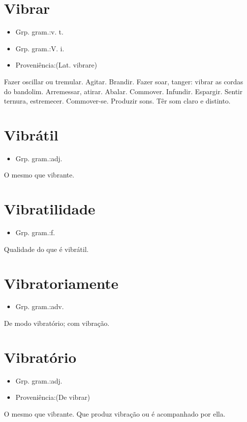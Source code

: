 \documentclass{article}
\begin{document}
\section{Vibrar}
\begin{itemize}
\item {Grp. gram.:v. t.}
\end{itemize}
\begin{itemize}
\item {Grp. gram.:V. i.}
\end{itemize}
\begin{itemize}
\item {Proveniência:(Lat. \textunderscore vibrare\textunderscore )}
\end{itemize}
Fazer oscillar ou tremular.
Agitar.
Brandir.
Fazer soar, tanger: \textunderscore vibrar as cordas do bandolim\textunderscore .
Arremessar, atirar.
Abalar.
Commover.
Infundir.
Espargir.
Sentir ternura, estremecer.
Commover-se.
Produzir sons.
Têr som claro e distinto.
\section{Vibrátil}
\begin{itemize}
\item {Grp. gram.:adj.}
\end{itemize}
O mesmo que \textunderscore vibrante\textunderscore .
\section{Vibratilidade}
\begin{itemize}
\item {Grp. gram.:f.}
\end{itemize}
Qualidade do que é vibrátil.
\section{Vibratoriamente}
\begin{itemize}
\item {Grp. gram.:adv.}
\end{itemize}
De modo vibratório; com vibração.
\section{Vibratório}
\begin{itemize}
\item {Grp. gram.:adj.}
\end{itemize}
\begin{itemize}
\item {Proveniência:(De \textunderscore vibrar\textunderscore )}
\end{itemize}
O mesmo que \textunderscore vibrante\textunderscore .
Que produz vibração ou é acompanhado por ella.
\end{document}
